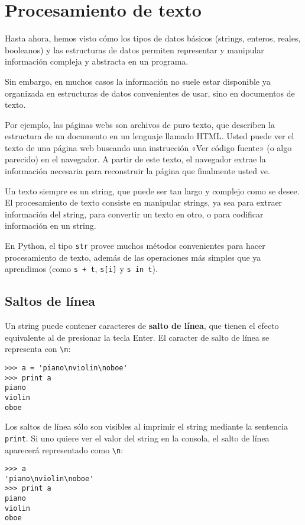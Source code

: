 \section{Procesamiento de texto}

Hasta ahora, hemos visto cómo los tipos de datos básicos (strings,
enteros, reales, booleanos) y las estructuras de datos permiten
representar y manipular información compleja y abstracta en un programa.

Sin embargo, en muchos casos la información no suele estar disponible ya
organizada en estructuras de datos convenientes de usar, sino en
documentos de texto.

Por ejemplo, las páginas webs son archivos de puro texto, que describen
la estructura de un documento en un lenguaje llamado HTML. Usted puede
ver el texto de una página web buscando una instrucción «Ver código
fuente» (o algo parecido) en el navegador. A partir de este texto, el
navegador extrae la información necesaria para reconstruir la página que
finalmente usted ve.

Un texto siempre es un string, que puede ser tan largo y complejo como
se desee. El procesamiento de texto consiste en manipular strings, ya
sea para extraer información del string, para convertir un texto en
otro, o para codificar información en un string.

En Python, el tipo \lstinline!str! provee muchos métodos convenientes
para hacer procesamiento de texto, además de las operaciones más simples
que ya aprendimos (como \lstinline!s + t!, \lstinline!s[i]! y
\lstinline!s in t!).

\subsection{Saltos de línea}

Un string puede contener caracteres de \textbf{salto de línea}, que
tienen el efecto equivalente al de presionar la tecla Enter. El caracter
de salto de línea se representa con \lstinline!\n!:

\begin{lstlisting}
>>> a = 'piano\nviolin\noboe'
>>> print a
piano
violin
oboe
\end{lstlisting}

Los saltos de línea sólo son visibles al imprimir el string mediante la
sentencia \lstinline!print!. Si uno quiere ver el valor del string en la
consola, el salto de línea aparecerá representado como \lstinline!\n!:

\begin{lstlisting}
>>> a
'piano\nviolin\noboe'
>>> print a
piano
violin
oboe
\end{lstlisting}

